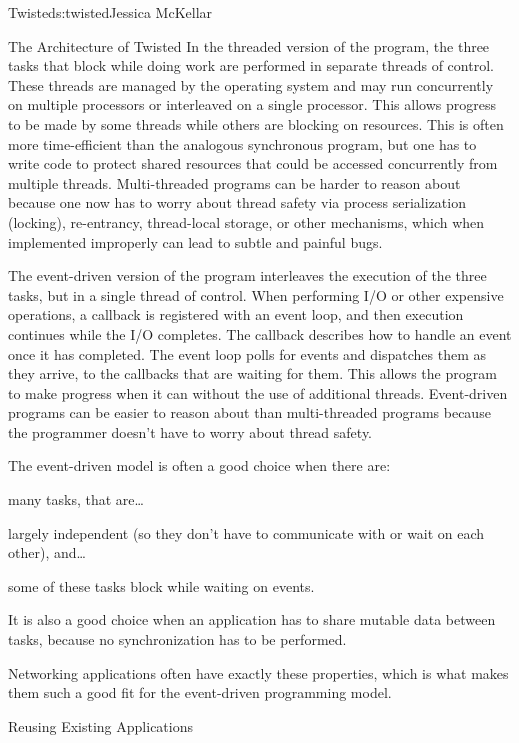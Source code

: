 \begin{aosachapter}{Twisted}{s:twisted}{Jessica McKellar}
\begin{aosasect1}{The Architecture of Twisted}
In the threaded version of the program, the three tasks that block while doing
work are performed in separate threads of control. These threads are managed by
the operating system and may run concurrently on multiple processors or
interleaved on a single processor. This allows progress to be made by some
threads while others are blocking on resources. This is often more
time-efficient than the analogous synchronous program, but one has to write code
to protect shared resources that could be accessed concurrently from multiple
threads. Multi-threaded programs can be harder to reason about because one now
has to worry about thread safety via process serialization (locking),
re-entrancy, thread-local storage, or other mechanisms, which when implemented
improperly can lead to subtle and painful bugs.

The event-driven version of the program interleaves the execution of the three
tasks, but in a single thread of control. When performing I/O or other expensive
operations, a callback is registered with an event loop, and then execution
continues while the I/O completes. The callback describes how to handle an event
once it has completed. The event loop polls for events and dispatches them as
they arrive, to the callbacks that are waiting for them. This allows the program
to make progress when it can without the use of additional threads. Event-driven
programs can be easier to reason about than multi-threaded programs because the
programmer doesn't have to worry about thread safety.

The event-driven model is often a good choice when there are:

\begin{aosaenumerate}

\item many tasks, that are\dots
\item largely independent (so they don't have to communicate with or
  wait on each other), and\ldots
\item some of these tasks block while waiting on events.

\end{aosaenumerate}

It is also a good choice when an application has to share mutable data
between tasks, because no synchronization has to be performed.

Networking applications often have exactly these properties, which is what
makes them such a good fit for the event-driven programming model.

\begin{aosasect2}{Reusing Existing Applications}


\end{aosasect2}
\end{aosasect1}
\end{aosachapter}
